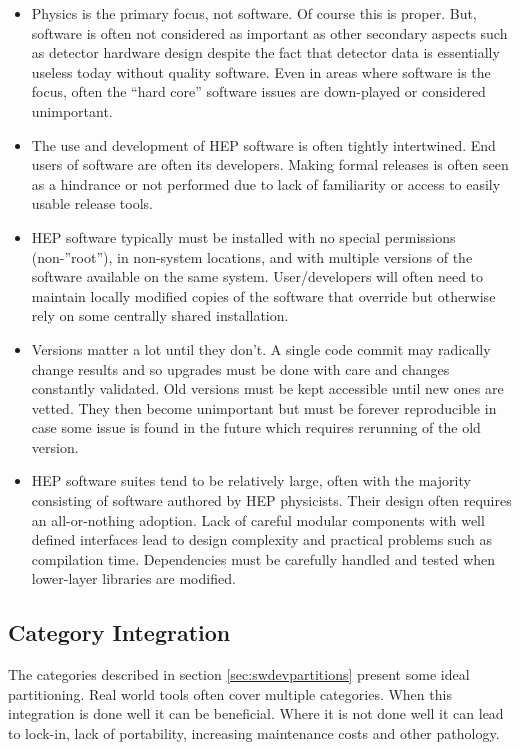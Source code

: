 \begin{itemize}
\item Physics is the primary focus, not software.  Of course this is
  proper.  But, software is often not considered as important as other
  secondary aspects such as detector hardware design despite the fact
  that detector data is essentially useless today without quality software.  Even
  in areas where software is the focus, often the ``hard core''
  software issues are down-played or considered unimportant.
\item The use and development of HEP software is often tightly
  intertwined.  End users of software are often its developers.
  Making formal releases is often seen as a hindrance or not 
  performed due to lack of familiarity or access to easily usable
  release tools.
\item HEP software typically must be installed with no special
  permissions (non-''root''), in non-system locations, and with
  multiple versions of the software available on the same system.
  User/developers will often need to maintain locally modified copies
  of the software that override but otherwise rely on some centrally
  shared installation.
\item Versions matter a lot until they don't.  A single code commit
  may radically change results and so upgrades must be done with care
  and changes constantly validated.  Old versions must be kept accessible
  until new ones are vetted.  They then become unimportant but must be
  forever reproducible in case some issue is found in the future which
  requires rerunning of the old version.
\item HEP software suites tend to be relatively large, often with the
  majority consisting of software authored by HEP physicists.  Their
  design often requires an all-or-nothing adoption.  Lack of careful
  modular components with well defined interfaces lead to design
  complexity and practical problems such as compilation time.
  Dependencies must be carefully handled and tested when lower-layer
  libraries are modified.
\end{itemize}



\subsection{Category Integration}

The categories described in section \ref{sec:swdevpartitions} present
some ideal partitioning.  Real world tools often cover multiple
categories.  When this integration is done well it can be beneficial.
Where it is not done well it can lead to lock-in, lack of portability,
increasing maintenance costs and other pathology.

